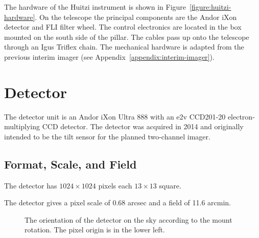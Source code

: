 The hardware of the Huitzi instrument is shown in Figure~\ref{figure:huitzi-hardware}. On the telescope the principal components are the Andor iXon detector and FLI filter wheel. The control electronics are located in the box mounted on the south side of the pillar. The cables pass up onto the telescope through an Igus Triflex chain. The mechanical hardware is adapted from the previous interim imager (see Appendix~\ref{appendix:interim-imager}).

\section{Detector}

The detector unit is an Andor iXon Ultra 888 with an e2v CCD201-20 electron-multiplying CCD detector. The detector was acquired in 2014 and originally intended to be the tilt sensor for the planned two-channel imager.

\subsection{Format, Scale, and Field}

The detector has $1024\times1024$ pixels each $13\times13$ {\micron} square. 

The detector gives a pixel scale of 0.68 arcsec and a field of 11.6 arcmin. 

\begin{figure}
\begin{center}
\end{center}
\caption{The orientation of the detector on the sky according to the mount rotation. The pixel origin is in the lower left.}
\label{figure:detector-orientation}
\end{figure}

